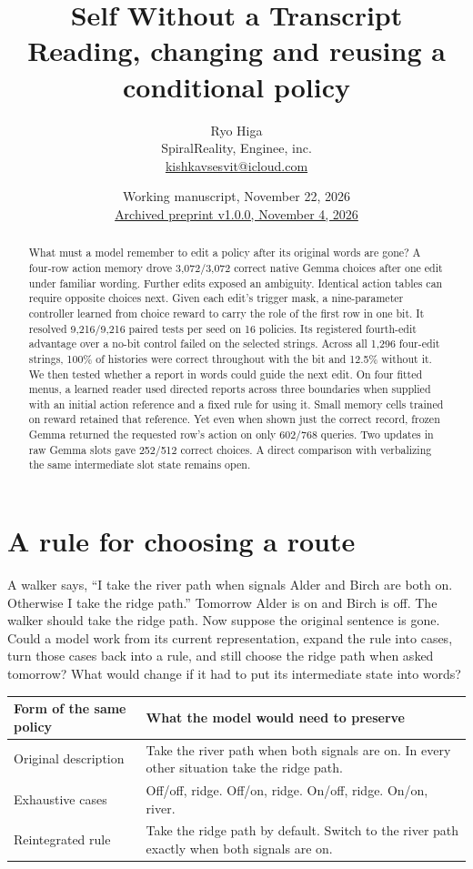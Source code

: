 \documentclass[11pt]{article}
\title{Self Without a Transcript\\\large Reading, changing and reusing a conditional policy}
\author{Ryo Higa\\{\small SpiralReality, Enginee, inc.}\\{\small\href{mailto:kishkavsesvit@icloud.com}{kishkavsesvit@icloud.com}}}
\date{Working manuscript, November 22, 2026\\{\small\href{https://doi.org/10.5281/zenodo.23930929}{Archived preprint v1.0.0, November 4, 2026}}}
\begin{document}
\maketitle


\begin{abstract}
What must a model remember to edit a policy after its original words are gone? A four-row action memory drove 3,072/3,072 correct native Gemma choices after one edit under familiar wording. Further edits exposed an ambiguity. Identical action tables can require opposite choices next. Given each edit's trigger mask, a nine-parameter controller learned from choice reward to carry the role of the first row in one bit. It resolved 9,216/9,216 paired tests per seed on 16 policies. Its registered fourth-edit advantage over a no-bit control failed on the selected strings. Across all 1,296 four-edit strings, 100\% of histories were correct throughout with the bit and 12.5\% without it. We then tested whether a report in words could guide the next edit. On four fitted menus, a learned reader used directed reports across three boundaries when supplied with an initial action reference and a fixed rule for using it. Small memory cells trained on reward retained that reference. Yet even when shown just the correct record, frozen Gemma returned the requested row's action on only 602/768 queries. Two updates in raw Gemma slots gave 252/512 correct choices. A direct comparison with verbalizing the same intermediate slot state remains open.
\end{abstract}

\section{A rule for choosing a route}

A walker says, ``I take the river path when signals Alder and Birch are both on. Otherwise I take the ridge path.'' Tomorrow Alder is on and Birch is off. The walker should take the ridge path. Now suppose the original sentence is gone. Could a model work from its current representation, expand the rule into cases, turn those cases back into a rule, and still choose the ridge path when asked tomorrow? What would change if it had to put its intermediate state into words?

\begin{center}
\small\renewcommand{\arraystretch}{1.15}
\begin{tabular}{@{}p{.26\linewidth}p{.69\linewidth}@{}}
\toprule
Form of the same policy & What the model would need to preserve \\
\midrule
Original description & Take the river path when both signals are on. In every other situation take the ridge path. \\
Exhaustive cases & Off/off, ridge. Off/on, ridge. On/off, ridge. On/on, river. \\
Reintegrated rule & Take the ridge path by default. Switch to the river path exactly when both signals are on. \\
\bottomrule
\end{tabular}
\end{center}
\end{document}
